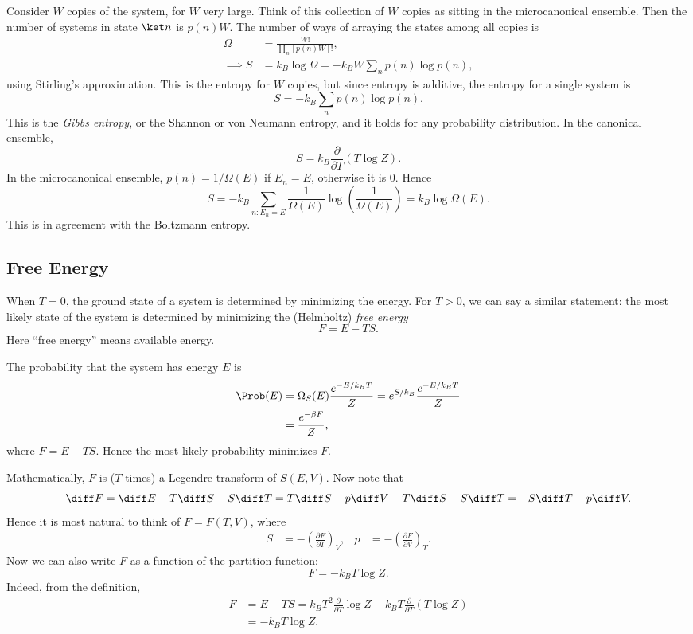 \documentclass[12pt]{article}
\begin{document}
Consider $W$ copies of the system, for $W$ very large. Think of this collection of $W$ copies as sitting in the microcanonical ensemble. Then the number of systems in state $\ket n$ is $p(n) W$. The number of ways of arraying the states among all copies is
\begin{align*}
	\Omega &= \frac{W!}{\prod_n [p(n)W]!},\\
	\implies S &= k_B \log \Omega = - k_B W \sum_n p(n) \log p(n),
\end{align*}
using Stirling's approximation. This is the entropy for $W$ copies, but since entropy is additive, the entropy for a single system is
\[
S = - k_B \sum_n p(n) \log p(n).
\]
This is the \emph{Gibbs entropy}, or the Shannon or von Neumann entropy, and it holds for any probability distribution. In the canonical ensemble,
\[
S = k_B \frac{\partial}{\partial T}(T \log Z).
\]
In the microcanonical ensemble, $p(n) = 1/\Omega(E)$ if $E_n = E$, otherwise it is 0. Hence
\[
	S = - k_B \sum_{n : E_n = E} \frac{1}{\Omega(E)} \log \left( \frac{1}{\Omega(E)} \right) = k_B \log \Omega(E).
\]
This is in agreement with the Boltzmann entropy.

\subsection{Free Energy}
\label{sub:free_e}

When $T = 0$, the ground state of a system is determined by minimizing the energy. For $T > 0$, we can say a similar statement: the most likely state of the system is determined by minimizing the (Helmholtz) \emph{free energy}
\[
F = E - TS.
\]
Here ``free energy'' means available energy.


\begin{proofbox}
	The probability that the system has energy $E$ is
	\begin{align*}
		\Prob(E) &= \Omega_S(E) \frac{e^{-E/k_BT}}{Z} = e^{S/k_B} \frac{e^{-E/k_BT}}{Z} \\
			 &= \frac{e^{-\beta F}}{Z},
	\end{align*}
	where $F = E - TS$. Hence the most likely probability minimizes $F$.
\end{proofbox}

Mathematically, $F$ is ($T$ times) a Legendre transform of $S(E, V)$. Now note that
\[
\diff F = \diff E - T \diff S - S \diff T = T \diff S - p \diff V - T \diff S - S \diff T = - S \diff T - p \diff V.
\]
Hence it is most natural to think of $F = F(T, V)$, where
\begin{align*}
	S &= -\left(\frac{\partial F}{\partial T} \right)_V, & p &= - \left( \frac{\partial F}{\partial V} \right)_T.
\end{align*}
Now we can also write $F$ as a function of the partition function:
\[
F = - k_B T \log Z.
\]
Indeed, from the definition,
\begin{align*}
	F &= E - TS = k_B T^2 \frac{\partial}{\partial T} \log Z - k_B T \frac{\partial}{\partial T}(T \log Z) \\
	  &= - k_B T \log Z.
\end{align*}
\end{document}
